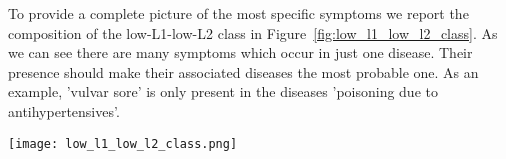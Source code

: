 \noindent
To provide a complete picture of the most specific symptoms we report the composition of the low-L1-low-L2 class
in Figure~\ref{fig:low_l1_low_l2_class}. As we can see there are many symptoms which occur in just one disease.
Their presence should make their associated diseases the most probable one. As an example, 'vulvar sore' 
is only present in the diseases 'poisoning due to antihypertensives'.\\

\begin{figure*}[!t]
    \centering
    \texttt{[image: low\_l1\_low\_l2\_class.png]}
    \caption{Composition of the low-L1-low-L2 class for symptoms}
    \label{fig:low_l1_low_l2_class}
\end{figure*}






